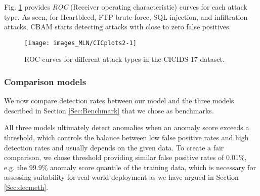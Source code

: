 Fig. \ref{fig:CICplots2} provides \emph{ROC} (Receiver operating characteristic) curves for each attack type. As seen, for Heartbleed, FTP brute-force, SQL injection, and infiltration attacks, CBAM starts detecting attacks with close to zero false positives.


\begin{figure}[ht]
\centering
\texttt{[image: images\_MLN/CICplots2-1]} 
\vspace{-0.5cm}
\caption[ROC-curves for different attack types.]{ROC-curves for different attack types in the CICIDS-17 dataset.}\label{fig:CICplots2}
\end{figure}

\subsubsection{Comparison models}\label{Sect:Comp}


We now compare detection rates between our model and the three models described in Section \ref{Sec:Benchmark} that we chose as benchmarks.

All three models ultimately detect anomalies when an anomaly score exceeds a threshold, which controls the balance between low false positive rates and high detection rates and usually depends on the given data. To create a fair comparison, we chose threshold providing similar false positive rates of $0.01\%$, e.g. the $99.9\%$ anomaly score quantile of the training data, which is necessary for assessing suitability for real-world deployment as we have argued in Section \ref{Sec:decmeth}. 

